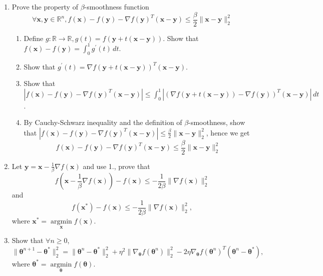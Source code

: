 \documentclass{article}
\begin{document}
\begin{enumerate}
\item Prove the property of $\beta$-smoothness function
 $$\forall \boldsymbol{x}, \boldsymbol{y} \in \mathbb{R}^n, 
 f(\boldsymbol{x})-f(\boldsymbol{y})-\nabla f(\boldsymbol{y})^T (\boldsymbol{x}-\boldsymbol{y}) \leq \frac{\beta}{2} \lVert \boldsymbol{x}-\boldsymbol{y} \rVert_2^2$$
 \begin{enumerate}
 \item Define $g: \mathbb{R} \rightarrow \mathbb{R}, g(t)=f(\boldsymbol{y}+t(\boldsymbol{x}-\boldsymbol{y}))$. Show that $f(\boldsymbol{x})-f(\boldsymbol{y})=\int_{0}^{1} g^{'}(t) \,dt$.
 \item Show that $g^{'}(t)= \nabla f(\boldsymbol{y}+t(\boldsymbol{x}-\boldsymbol{y}))^T(\boldsymbol{x}-\boldsymbol{y})$.
 \item Show that $|f(\boldsymbol{x})-f(\boldsymbol{y})- \nabla f(\boldsymbol{y})^T(\boldsymbol{x}-\boldsymbol{y})| \leq \int_{0}^{1} |(\nabla f(\boldsymbol{y}+t(\boldsymbol{x}-\boldsymbol{y})) - \nabla f(\boldsymbol{y}))^T(\boldsymbol{x}-\boldsymbol{y})| \, dt$.
 \item By Cauchy-Schwarz inequality and the definition of $\beta$-smoothness, show that $|f(\boldsymbol{x})-f(\boldsymbol{y})- \nabla f(\boldsymbol{y})^T(\boldsymbol{x}-\boldsymbol{y})| \leq \frac{\beta}{2} \lVert \boldsymbol{x}-\boldsymbol{y} \rVert_2^2$, hence we get $$f(\boldsymbol{x})-f(\boldsymbol{y})-\nabla f(\boldsymbol{y})^T (\boldsymbol{x}-\boldsymbol{y}) \leq \frac{\beta}{2} \lVert \boldsymbol{x}-\boldsymbol{y} \rVert_2^2$$
 \end{enumerate}
 \item Let $\boldsymbol{y} = \boldsymbol{x} - \frac{1}{\beta} \nabla f(\boldsymbol{x})$ and use 1., prove that 
 $$f(\boldsymbol{x} - \frac{1}{\beta} \nabla f(\boldsymbol{x})) - f(\boldsymbol{x}) \leq -\frac{1}{2\beta} \lVert \nabla f(\boldsymbol{x}) \rVert_2^2$$
 and 
 $$f(\boldsymbol{x}^{*}) - f(\boldsymbol{x}) \leq -\frac{1}{2\beta} \lVert \nabla f(\boldsymbol{x}) \rVert_2^2,$$
 where $\boldsymbol{x}^{*} = \mathop{\arg\min}\limits_{\boldsymbol{x}} f(\boldsymbol{x})$.
 \item Show that $\forall n \geq 0$, 
 $$\lVert \boldsymbol{\theta}^{n+1} - \boldsymbol{\theta}^{*} \rVert_2^2= \lVert \boldsymbol{\theta}^{n} - \boldsymbol{\theta}^{*} \rVert_2^2 + \eta^2\lVert \nabla_{\boldsymbol{\theta}} f(\boldsymbol{\theta}^n) \rVert_2^2 -2 \eta \nabla_{\boldsymbol{\theta}} f(\boldsymbol{\theta}^n)^T(\boldsymbol{\theta}^n-\boldsymbol{\theta}^{*}),$$ where $\boldsymbol{\theta}^{*} = \mathop{\arg\min}\limits_{\boldsymbol{\theta}} f(\boldsymbol{\theta})$.\\

\end{enumerate}
\end{document}

